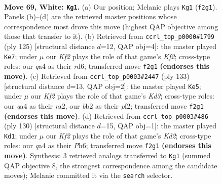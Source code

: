 \documentclass[11pt]{article}
\begin{document}
\clearpage

\begin{figure}[p]\centering
\begin{subfigure}{0.46\textwidth}\centering
\resizebox{\linewidth}{!}{%
\newchessgame
\chessboard[
  setfen={8/8/8/7R/qp1k4/5B2/1b3K2/8 w - - 28 69},
  showmover=false,
  pgfstyle=straightmove, color=movearrow, markmove={f2-g1}
]}
\caption{}
\end{subfigure}\hfill
\begin{subfigure}{0.46\textwidth}\centering
\resizebox{\linewidth}{!}{%
\newchessgame
\chessboard[
  setfen={8/5k2/3R4/8/4B3/2b5/5PK1/r7 b - - 4 63},
  showmover=false,
  pgfstyle=straightmove, color=movearrow, markmove={f7-e7}
]}
\caption{}
\end{subfigure}
\\[4pt]
\begin{subfigure}{0.46\textwidth}\centering
\resizebox{\linewidth}{!}{%
\newchessgame
\chessboard[
  setfen={8/1r6/2bk4/8/8/2K5/R4P2/8 b - - 1 67},
  showmover=false,
  pgfstyle=straightmove, color=movearrow, markmove={d6-e5}
]}
\caption{}
\end{subfigure}\hfill
\begin{subfigure}{0.46\textwidth}\centering
\resizebox{\linewidth}{!}{%
\newchessgame
\chessboard[
  setfen={8/7b/3p3P/8/4k3/8/3K4/2B5 w - - 13 66},
  showmover=false,
  pgfstyle=straightmove, color=movearrow, markmove={d2-d1}
]}
\caption{}
\end{subfigure}
\caption{\textbf{Move 69, White: \texttt{Kg1}.} (a) Our position; Melanie plays \texttt{Kg1} (\texttt{f2g1}). Panels (b)--(d) are the retrieved master positions whose correspondence most drove this move (highest QAP objective among those that transfer to it). (b) Retrieved from \texttt{ccrl\_top\_p0000\#1799} (ply 125) [structural distance $d$=12, QAP obj=4]: the master played \texttt{Ke7}; under $\mu$ our \emph{Kf2} plays the role of that game's \emph{Kf2}; cross-type roles: our \emph{q}a4 as their \emph{r}d6; transferred move \texttt{f2g1} \textbf{(endorses this move)}. (c) Retrieved from \texttt{ccrl\_top\_p0003\#2447} (ply 133) [structural distance $d$=13, QAP obj=2]: the master played \texttt{Ke5}; under $\mu$ our \emph{Kf2} plays the role of that game's \emph{Kd3}; cross-type roles: our \emph{q}a4 as their \emph{r}a2, our \emph{b}b2 as their \emph{p}f2; transferred move \texttt{f2g1} \textbf{(endorses this move)}. (d) Retrieved from \texttt{ccrl\_top\_p0003\#486} (ply 130) [structural distance $d$=15, QAP obj=1]: the master played \texttt{Kd1}; under $\mu$ our \emph{Kf2} plays the role of that game's \emph{Kd2}; cross-type roles: our \emph{q}a4 as their \emph{P}h6; transferred move \texttt{f2g1} \textbf{(endorses this move)}. Synthesis: 3 retrieved analogs transferred to \texttt{Kg1} (summed QAP objective 8, the strongest correspondence among the candidate moves); Melanie committed it via the \texttt{search} selector.}
\label{fig:thought-m136}
\end{figure}
\end{document}

